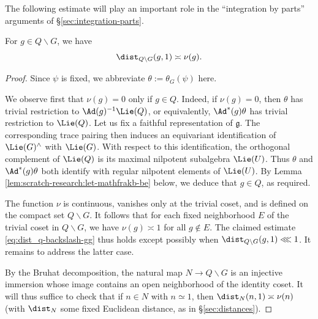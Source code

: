 The following estimate will play an important role in the ``integration by parts'' arguments of \S\ref{sec:integration-parts}.
\begin{lemma}\label{lem:sub-gln:g-in-q}
  For $g \in Q \backslash G$, we have
  \begin{equation}\label{eq:dist_q-backslash-gg}
    \dist_{Q \backslash G}(g, 1) \asymp \nu(g).
  \end{equation}
\end{lemma}
\begin{proof}
  Since $\psi$ is fixed, we abbreviate $\theta := \theta_G(\psi)$ here.

  We observe first that $\nu(g) = 0$ only if $g \in Q$.  Indeed, if $\nu(g) = 0$, then $\theta$ has trivial restriction to $\Ad(g)^{-1} \Lie(Q)$, or equivalently, $\Ad^*(g) \theta$ has trivial restriction to $\Lie(Q)$.  Let us fix a faithful representation of $\mathfrak{g}$.  The corresponding trace pairing then induces an equivariant identification of $\Lie(G)^\wedge$ with $\Lie(G)$.  With respect to this identification, the orthogonal complement of $\Lie(Q)$ is its maximal nilpotent subalgebra $\Lie(U)$.  Thus $\theta$ and $\Ad^*(g) \theta$ both identify with regular nilpotent elements of $\Lie(U)$.  By Lemma \ref{lem:scratch-research:let-mathfrakb-be} below, we deduce that $g \in Q$, as required.


  The function $\nu$ is continuous, vanishes only at the trivial coset, and is defined on the compact set $Q \backslash G$.  It follows that for each fixed neighborhood $E$ of the trivial coset in $Q \backslash G$, we have $\nu(g) \asymp 1$ for all $g \notin E$.  The claimed estimate \eqref{eq:dist_q-backslash-gg} thus holds except possibly when $\dist_{Q \backslash G}(g,1) \lll 1$.  It remains to address the latter case.

  By the Bruhat decomposition, the natural map $N \rightarrow Q \backslash G$ is an injective immersion whose image contains an open neighborhood of the identity coset.  It will thus suffice to check that if $n \in N$ with $n \simeq 1$, then $\dist_{N}(n,1) \asymp \nu(n)$ (with $\dist_N$ some fixed Euclidean distance, as in \S\ref{sec:distances}).


\end{proof}
